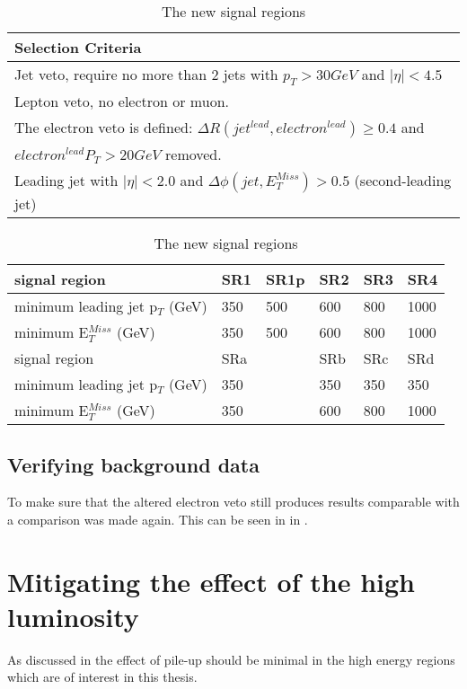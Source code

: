 \begin{table}[h]
\begin{center}
\begin{tabular}{l}
\hline
Selection Criteria \\ \hline
Jet veto, require no more than 2 jets with $p_T > 30 GeV$ and $|\eta| < 4.5$ \\
Lepton veto, no electron or muon. \\
The electron veto is defined: $\Delta R (jet^{lead},electron^{lead})\geq 0.4$ and \\
$electron^{lead} P_T>20 GeV$ removed.\\
Leading jet with $|\eta| < 2.0$ and $\Delta \phi (jet, E_T^{Miss})>0.5$ (second-leading jet) \\ 
\end{tabular}
\begin{tabular}{l l l l l l}
\hline
signal region & SR1 & SR1p & SR2 & SR3 & SR4 \\ \hline
minimum leading jet p$_T$ (GeV) & 350 &500& 600 & 800 & 1000 \\
minimum E$^{Miss}_T$ (GeV) & 350&500 & 600 & 800 & 1000 \\ \hline
signal region & SRa &  & SRb & SRc & SRd \\ \hline
minimum leading jet p$_T$ (GeV) & 350 & & 350 & 350 & 350 \\
minimum E$^{Miss}_T$ (GeV) & 350 & & 600 & 800 & 1000 \\ \hline
\end{tabular}
\label{tab:newsr}
\caption{The new signal regions}
\end{center}
\end{table}

\subsection{Verifying background data}
To make sure that the altered electron veto still produces results comparable with \citep{ATLAS-CONF-2012-147} a comparison was made again. This can be seen in  in .


\newpage
\section{Mitigating the effect of the high luminosity}
As discussed in  the effect of pile-up should be minimal in the high energy regions which are of interest in this thesis. 

